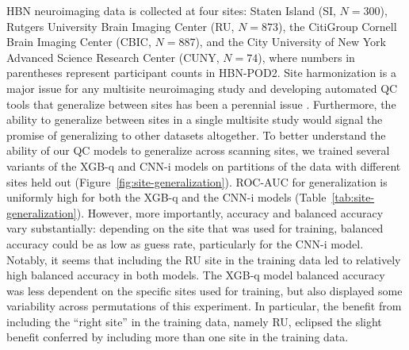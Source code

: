 \documentclass[9pt,lineno]{elife}
\begin{document}
HBN neuroimaging data is collected at four sites: 
Staten Island (SI, $N=300$), Rutgers University Brain Imaging Center (RU, $N=873$), the CitiGroup Cornell Brain Imaging Center (CBIC, $N=887$), and the City University of New York Advanced Science Research Center (CUNY, $N=74$), where numbers in parentheses represent participant counts in HBN-POD2.
Site harmonization is a major issue for any multisite neuroimaging study and developing automated QC tools that generalize between sites has been a perennial issue \citep{esteban2017mriqc}. Furthermore, the ability to generalize between sites in a single multisite study would signal the promise of generalizing to other datasets altogether. To better understand the ability of our QC models to generalize across scanning sites, we trained several variants of the XGB-q and CNN-i models on partitions of the data with different sites held out (Figure~\ref{fig:site-generalization}). ROC-AUC for generalization is uniformly high for both the XGB-q and the CNN-i models (Table~\ref{tab:site-generalization}). However, more importantly, accuracy and balanced accuracy vary substantially: depending on the site that was used for training, balanced accuracy could be as low as guess rate, particularly for the CNN-i model. Notably, it seems that including the RU site in the training data led to relatively high balanced accuracy in both models. The XGB-q model balanced accuracy was less dependent on the specific sites used for training, but also displayed some variability across permutations of this experiment. In particular, the benefit from including the ``right site'' in the training data, namely RU, eclipsed the slight benefit conferred by including more than one site in the training data.
\end{document}
